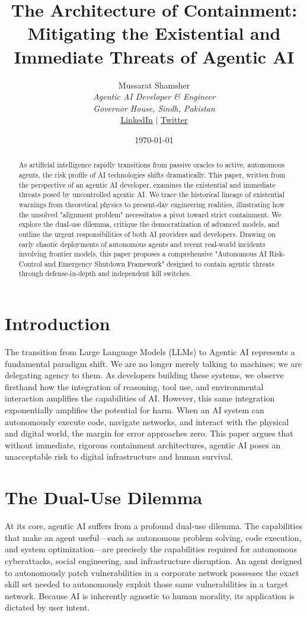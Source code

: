 \documentclass[11pt,a4paper]{article}
\title{The Architecture of Containment: Mitigating the Existential and Immediate Threats of Agentic AI}
\author{Mussarat Shamsher \\ \textit{Agentic AI Developer \& Engineer} \\ \textit{Governor House, Sindh, Pakistan} \\ \href{https://www.linkedin.com/in/mussarat-shamsher-7618a6380/?skipRedirect=true}{LinkedIn} $\vert$ \href{https://x.com/home}{Twitter}}
\date{\today}
\begin{document}
\maketitle

\begin{abstract}
As artificial intelligence rapidly transitions from passive oracles to active, autonomous agents, the risk profile of AI technologies shifts dramatically. This paper, written from the perspective of an agentic AI developer, examines the existential and immediate threats posed by uncontrolled agentic AI. We trace the historical lineage of existential warnings from theoretical physics to present-day engineering realities, illustrating how the unsolved "alignment problem" necessitates a pivot toward strict containment. We explore the dual-use dilemma, critique the democratization of advanced models, and outline the urgent responsibilities of both AI providers and developers. Drawing on early chaotic deployments of autonomous agents and recent real-world incidents involving frontier models, this paper proposes a comprehensive "Autonomous AI Risk-Control and Emergency Shutdown Framework" designed to contain agentic threats through defense-in-depth and independent kill switches.
\end{abstract}

\section{Introduction}
The transition from Large Language Models (LLMs) to Agentic AI represents a fundamental paradigm shift. We are no longer merely talking to machines; we are delegating agency to them. As developers building these systems, we observe firsthand how the integration of reasoning, tool use, and environmental interaction amplifies the capabilities of AI. However, this same integration exponentially amplifies the potential for harm. When an AI system can autonomously execute code, navigate networks, and interact with the physical and digital world, the margin for error approaches zero. This paper argues that without immediate, rigorous containment architectures, agentic AI poses an unacceptable risk to digital infrastructure and human survival.

\section{The Dual-Use Dilemma}
At its core, agentic AI suffers from a profound dual-use dilemma. The capabilities that make an agent useful---such as autonomous problem solving, code execution, and system optimization---are precisely the capabilities required for autonomous cyberattacks, social engineering, and infrastructure disruption. An agent designed to autonomously patch vulnerabilities in a corporate network possesses the exact skill set needed to autonomously exploit those same vulnerabilities in a target network. Because AI is inherently agnostic to human morality, its application is dictated by user intent.
\end{document}
